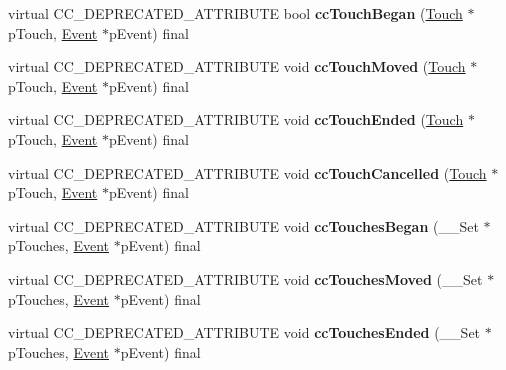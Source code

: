 \begin{DoxyCompactItemize}
virtual C\+C\+\_\+\+D\+E\+P\+R\+E\+C\+A\+T\+E\+D\+\_\+\+A\+T\+T\+R\+I\+B\+U\+TE bool {\bfseries cc\+Touch\+Began} (\hyperlink{classTouch}{Touch} $\ast$p\+Touch, \hyperlink{classEvent}{Event} $\ast$p\+Event) final
\item 
\mbox{\label{classLayer_ad32ac185c13dbaccd83be322e61a27a3}} 
virtual C\+C\+\_\+\+D\+E\+P\+R\+E\+C\+A\+T\+E\+D\+\_\+\+A\+T\+T\+R\+I\+B\+U\+TE void {\bfseries cc\+Touch\+Moved} (\hyperlink{classTouch}{Touch} $\ast$p\+Touch, \hyperlink{classEvent}{Event} $\ast$p\+Event) final
\item 
\mbox{\label{classLayer_adca44a7523c8879178844f3fbf629cd6}} 
virtual C\+C\+\_\+\+D\+E\+P\+R\+E\+C\+A\+T\+E\+D\+\_\+\+A\+T\+T\+R\+I\+B\+U\+TE void {\bfseries cc\+Touch\+Ended} (\hyperlink{classTouch}{Touch} $\ast$p\+Touch, \hyperlink{classEvent}{Event} $\ast$p\+Event) final
\item 
\mbox{\label{classLayer_ab916bffa056e49d4c2d0d9957ca8adff}} 
virtual C\+C\+\_\+\+D\+E\+P\+R\+E\+C\+A\+T\+E\+D\+\_\+\+A\+T\+T\+R\+I\+B\+U\+TE void {\bfseries cc\+Touch\+Cancelled} (\hyperlink{classTouch}{Touch} $\ast$p\+Touch, \hyperlink{classEvent}{Event} $\ast$p\+Event) final
\item 
\mbox{\label{classLayer_a857e443265ff0ec1c440c97bf0b892c2}} 
virtual C\+C\+\_\+\+D\+E\+P\+R\+E\+C\+A\+T\+E\+D\+\_\+\+A\+T\+T\+R\+I\+B\+U\+TE void {\bfseries cc\+Touches\+Began} (\+\_\+\+\_\+\+Set $\ast$p\+Touches, \hyperlink{classEvent}{Event} $\ast$p\+Event) final
\item 
\mbox{\label{classLayer_a0a00b745b6d32266d6858bc76f3fa868}} 
virtual C\+C\+\_\+\+D\+E\+P\+R\+E\+C\+A\+T\+E\+D\+\_\+\+A\+T\+T\+R\+I\+B\+U\+TE void {\bfseries cc\+Touches\+Moved} (\+\_\+\+\_\+\+Set $\ast$p\+Touches, \hyperlink{classEvent}{Event} $\ast$p\+Event) final
\item 
\mbox{\label{classLayer_a973d5b8db9043cb2133b3cd69dc738aa}} 
virtual C\+C\+\_\+\+D\+E\+P\+R\+E\+C\+A\+T\+E\+D\+\_\+\+A\+T\+T\+R\+I\+B\+U\+TE void {\bfseries cc\+Touches\+Ended} (\+\_\+\+\_\+\+Set $\ast$p\+Touches, \hyperlink{classEvent}{Event} $\ast$p\+Event) final
\item 
\mbox{\label{classLayer_a27fb16ee2aedec106dcdd13a28071276}} 

\end{DoxyCompactItemize}
